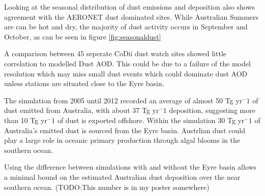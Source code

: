 
Looking at the seasonal distribution of dust emissions and deposition also shows agreement with the AERONET dust dominated sites.
While Australian Summers are can be hot and dry, the majority of dust activity occurs in September and October, as can be seen in figure \ref{fig:seasonaldust}

A comparison between 45 seperate CoDii dust watch sites showed little correlation to modelled Dust AOD.
This could be due to a failure of the model resolution which may miss small dust events which could dominate dust AOD unless stations are situated close to the Eyre basin.

The simulation from 2005 until 2012 recorded an average of almost 50 Tg yr$^-1$ of dust emitted from Australia, with about 37 Tg yr$^-1$ deposition, suggesting more than 10 Tg yr$^-1$ of dust is exported offshore.
Within the simulation 30 Tg yr$^-1$ of Australia's emitted dust is sourced from the Eyre basin.
Austrlian dust could play a large role in oceanic primary production through algal blooms in the southern ocean.

Using the difference between simulations with and without the Eyre basin allows a minimal bound on the estimated Australian dust deposition over the near southern ocean.
(TODO:This number is in my poster somewhere) 